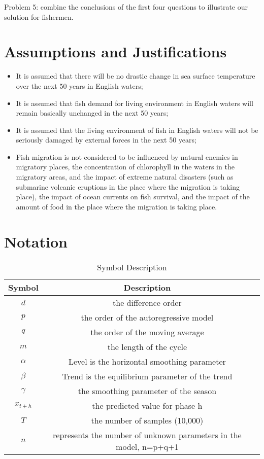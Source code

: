 \documentclass{mcmthesis}
\begin{document}
Problem 5: combine the conclusions of the first four questions to illustrate our solution for fishermen.

\section{Assumptions and Justifications}
\begin{itemize}
	
	\item It is assumed that there will be no drastic change in sea surface temperature over the next 50 years in English waters;
	
	\item It is assumed that fish demand for living environment in English waters will remain basically unchanged in the next 50 years;
	
	\item It is assumed that the living environment of fish in English waters will not be seriously damaged by external forces in the next 50 years;
	
	\item Fish migration is not considered to be influenced by natural enemies in migratory places, the concentration of chlorophyll in the waters in the migratory areas, and the impact of extreme natural disasters (such as submarine volcanic eruptions in the place where the migration is taking place), the impact of ocean currents on fish survival, and the impact of the amount of food in the place where the migration is taking place.
	
\end{itemize}

\section{Notation}%
\begin{table}[htbp]

	\center
	\begin{tabular}{ccc}
		\toprule
		Symbol & Description \\
		\midrule
		$d$ & the difference order \\
		$p$ & the order of the autoregressive model \\
		$q$ & the order of the moving average \\
		$m$ & the length of the cycle \\
		$\alpha$ & Level is the horizontal smoothing parameter \\
		$\beta$ & Trend is the equilibrium parameter of the trend \\
		$\gamma$ & the smoothing parameter of the season \\
		$x_{t+h}$ & the predicted value for phase h \\
		$T$ & the number of samples (10,000) \\
		$n$ & represents the number of unknown parameters in the model, n=p+q+1 \\
		\bottomrule
	\end{tabular}
	\caption{\label{tab:test}Symbol Description}
\end{table}
\end{document}
